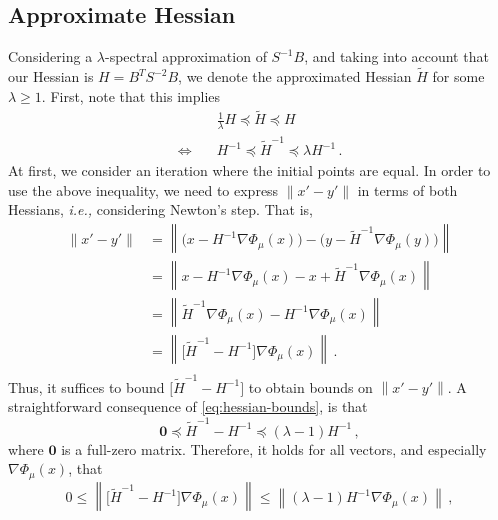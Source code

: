 \subsection{Approximate Hessian}

Considering a $\lambda$-spectral approximation of $S^{-1}B$, and taking into
account that our Hessian is $H = B^TS^{-2}B$, we denote the approximated Hessian
$\tilde H$ for some $\lambda \geq 1$. First, note that this implies
\begin{equation}\label{eq:hessian-bounds}
    \begin{aligned}
        & \frac{1}{\lambda} H \preccurlyeq \tilde H \preccurlyeq H \\
\Leftrightarrow \quad & H^{-1} \preccurlyeq \tilde H^{-1} \preccurlyeq \lambda H^{-1} \, .
    \end{aligned}
\end{equation}
At first, we consider an iteration  where the initial points are equal. In order
to use the above inequality, we need to express $\| x' - y' \|$ in terms of
both Hessians, \emph{i.e.,} considering Newton's step. That is,
\begin{equation} \label{eq:vector-distance}
    \begin{aligned}
        \left\| x' - y' \right\|
            & = \left\| \Big(x - H^{-1}\nabla\Phi_\mu(x)\Big) - \Big(y - \tilde H^{-1}\nabla\Phi_\mu(y)\Big)\right\| \\
            & = \left\| x - H^{-1}\nabla\Phi_\mu(x) - x + \tilde H^{-1}\nabla\Phi_\mu(x)\right\| \\
            & = \left\| \tilde H^{-1}\nabla\Phi_\mu(x) - H^{-1}\nabla\Phi_\mu(x) \right\| \\
            & = \left\| \Big[ \tilde H^{-1} - H^{-1}\Big ] \nabla\Phi_\mu(x) \right\| \, . \\
    \end{aligned}
\end{equation}
Thus, it suffices to bound $\big[ \tilde H^{-1} - H^{-1}\big ] $ to obtain
bounds on $\left\| x' - y' \right\|$. A straightforward consequence of
\autoref{eq:hessian-bounds}, is that
\begin{equation*}
\boldsymbol 0 \preccurlyeq \tilde H^{-1} - H^{-1} \preccurlyeq (\lambda - 1) H^{-1} \, ,
\end{equation*}
where $\boldsymbol 0$ is a full-zero matrix.
Therefore, it holds for all vectors, and especially $\nabla \Phi_\mu(x)$, that
\begin{equation*}
    0 \leq \left\| \Big[ \tilde H^{-1} - H^{-1}\Big ] \nabla\Phi_\mu(x) \right\|
 \leq \left\| (\lambda - 1) H^{-1} \nabla\Phi_\mu(x) \right\| \, ,
\end{equation*}

